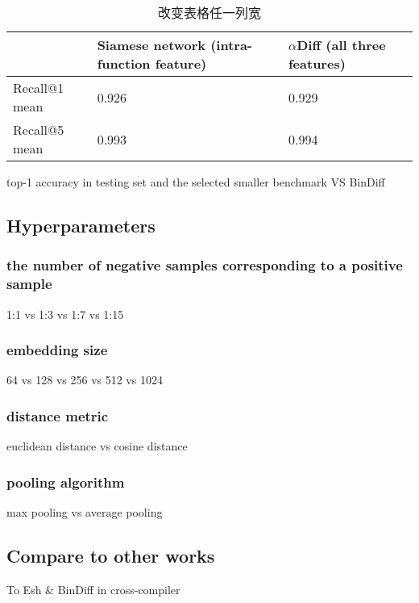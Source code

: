 \documentclass[10pt,conference]{IEEEtran}
\begin{document}
  \begin{table}[!t]
  \caption{改变表格任一列宽}
  \begin{tabular}{p{2cm}|p{3cm}|p{3cm}}  
  \hline  
  \hline  
   & Siamese network \textbf{(intra-function feature)} & $\alpha$Diff \textbf{(all three features)} \\  
  \hline
  Recall@1 mean & 0.926 & 0.929 \\  
  \hline  
  Recall@5 mean & 0.993 & 0.994 \\   
  \hline  
  \hline  
  \end{tabular}  
  \end{table} 

   

top-1 accuracy in testing set and the selected smaller benchmark VS BinDiff

\subsection{Hyperparameters}
\subsubsection{the number of negative samples corresponding to a positive sample}

1:1 vs 1:3 vs 1:7 vs 1:15

\subsubsection{embedding size}

64 vs 128 vs 256 vs 512 vs 1024

\subsubsection{distance metric}

euclidean distance vs cosine distance

\subsubsection{pooling algorithm}
max pooling vs average pooling

\subsection{Compare to other works}

\par To Esh \& BinDiff in cross-compiler
\end{document}
